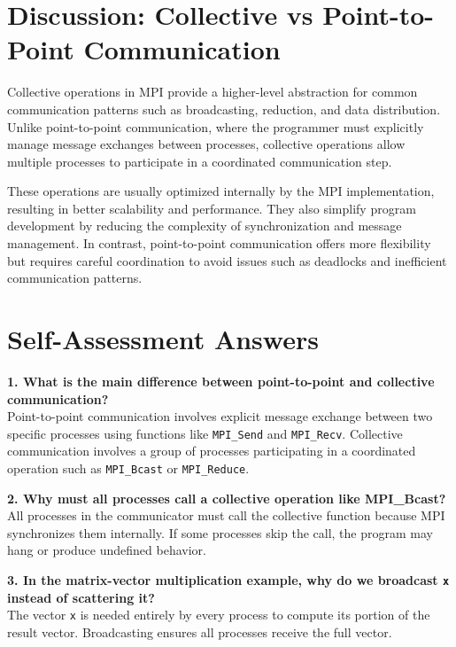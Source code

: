 \documentclass[12pt]{article}
\begin{document}
\section{Discussion: Collective vs Point-to-Point Communication}

Collective operations in MPI provide a higher-level abstraction for common
communication patterns such as broadcasting, reduction, and data distribution.
Unlike point-to-point communication, where the programmer must explicitly
manage message exchanges between processes, collective operations allow
multiple processes to participate in a coordinated communication step.

These operations are usually optimized internally by the MPI implementation,
resulting in better scalability and performance. They also simplify program
development by reducing the complexity of synchronization and message
management. In contrast, point-to-point communication offers more flexibility
but requires careful coordination to avoid issues such as deadlocks and
inefficient communication patterns.

\section{Self-Assessment Answers}

\textbf{1. What is the main difference between point-to-point and collective communication?} \\
Point-to-point communication involves explicit message exchange between two specific processes using functions like \texttt{MPI\_Send} and \texttt{MPI\_Recv}. Collective communication involves a group of processes participating in a coordinated operation such as \texttt{MPI\_Bcast} or \texttt{MPI\_Reduce}.

\vspace{0.3cm}

\textbf{2. Why must all processes call a collective operation like MPI\_Bcast?} \\
All processes in the communicator must call the collective function because MPI synchronizes them internally. If some processes skip the call, the program may hang or produce undefined behavior.

\vspace{0.3cm}

\textbf{3. In the matrix-vector multiplication example, why do we broadcast \texttt{x} instead of scattering it?} \\
The vector \texttt{x} is needed entirely by every process to compute its portion of the result vector. Broadcasting ensures all processes receive the full vector.
\end{document}
